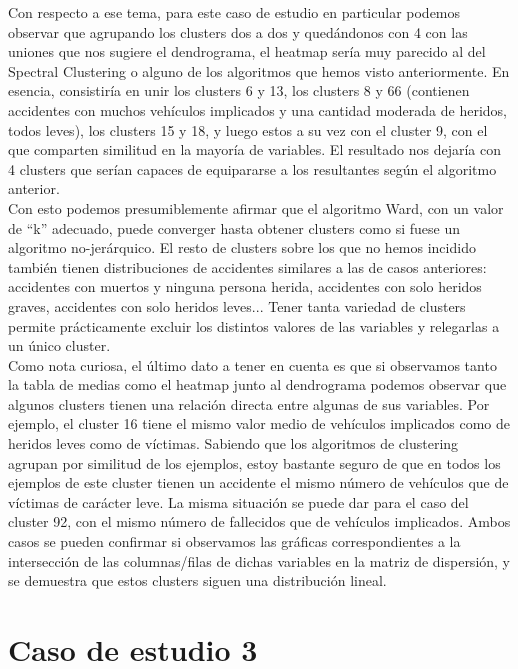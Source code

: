 	Con respecto a ese tema, para este caso de estudio en particular podemos observar que agrupando los clusters dos a dos y quedándonos con 4 con las uniones que nos sugiere el dendrograma, el heatmap sería muy parecido al del Spectral Clustering o alguno de los algoritmos que hemos visto anteriormente. En esencia, consistiría en unir los clusters 6 y 13, los clusters 8 y 66 (contienen accidentes con muchos vehículos implicados y una cantidad moderada de heridos, todos leves), los clusters 15 y 18, y luego estos a su vez con el cluster 9, con el que comparten similitud en la mayoría de variables. El resultado nos dejaría con 4 clusters que serían capaces de equipararse a los resultantes según el algoritmo anterior.\\
	
	Con esto podemos presumiblemente afirmar que el algoritmo Ward, con un valor de ``k'' adecuado, puede converger hasta obtener clusters como si fuese un algoritmo no-jerárquico. El resto de clusters sobre los que no hemos incidido también tienen distribuciones de accidentes similares a las de casos anteriores: accidentes con muertos y ninguna persona herida, accidentes con solo heridos graves, accidentes con solo heridos leves... Tener tanta variedad de clusters permite prácticamente excluir los distintos valores de las variables y relegarlas a un único cluster.\\
	
	Como nota curiosa, el último dato a tener en cuenta es que si observamos tanto la tabla de medias como el heatmap junto al dendrograma podemos observar que algunos clusters tienen una relación directa entre algunas de sus variables. Por ejemplo, el cluster 16 tiene el mismo valor medio de vehículos implicados como de heridos leves como de víctimas. Sabiendo que los algoritmos de clustering agrupan por similitud de los ejemplos, estoy bastante seguro de que en todos los ejemplos de este cluster tienen un accidente el mismo número de vehículos que de víctimas de carácter leve. La misma situación se puede dar para el caso del cluster 92, con el mismo número de fallecidos que de vehículos implicados. Ambos casos se pueden confirmar si observamos las gráficas correspondientes a la intersección de las columnas/filas de dichas variables en la matriz de dispersión, y se demuestra que estos clusters siguen una distribución lineal.

	\section{Caso de estudio 3}
	
